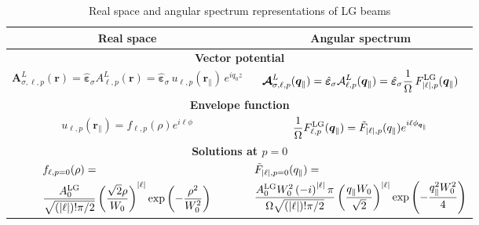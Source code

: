 \begin{table}[H]
\centering
\caption{Real space and angular spectrum representations of LG beams}
\label{tab:my_formulas}

\begin{tabular}{|c|c|}
\hline
\textbf{Real space} & \textbf{Angular spectrum} \\ \hline

\hline
\multicolumn{2}{|c|}{\textbf{Vector potential}} \\ \hline
\rule[-2.5ex]{0pt}{6.5ex} %
$\displaystyle \boldsymbol{A}^{L}_{\sigma, \ell, p}(\boldsymbol{r})
=
\hat{\boldsymbol{\varepsilon}}_\sigma A^{L}_{\ell, p}(\boldsymbol{r})
=
\hat{\boldsymbol{\varepsilon}}_\sigma
\, u_{\ell, p}(\boldsymbol{r}_\parallel)
\, e^{i q_0 z}$
&
$\displaystyle \boldsymbol{\mathcal{A}}^L_{\sigma, \ell, p}(\boldsymbol{q}_\parallel)
=
\hat{\boldsymbol{\varepsilon}}_\sigma \mathcal{A}^L_{\ell, p}(\boldsymbol{q}_\parallel)
=
\hat{\boldsymbol{\varepsilon}}_\sigma
\frac{1}{\Omega}
\, F_{|\ell|, p}^{\rm LG}(\boldsymbol{q}_\parallel)$ \\ \hline

\hline
\multicolumn{2}{|c|}{\textbf{Envelope function}} \\ \hline
\rule[-2.5ex]{0pt}{6.5ex}
$\displaystyle u_{\ell, p}(\boldsymbol{r}_\parallel)
=
f_{\ell, p}(\rho)e^{i \ell \phi}$
&
$\displaystyle \frac{1}{\Omega}F_{\ell, p}^{\rm LG}(\boldsymbol{q}_\parallel)
=
\tilde{F}_{\left|\ell\right|, p}(q_\parallel)e^{i \ell \phi_{\boldsymbol{q}_{\parallel}}}$ \\ \hline

\hline
\multicolumn{2}{|c|}{\textbf{Solutions at $p=0$}} \\ \hline
\rule[-6ex]{0pt}{13ex} %
$\begin{aligned} 
&\displaystyle f_{\ell, p=0}(\rho) = \\
&\displaystyle \frac{A^{\rm LG}_0}{\sqrt{(|\ell|)!\pi/2}}
\left( \frac{\sqrt{2}\rho}{W_0} \right)^{|\ell|} \exp\left( -\frac{\rho^2}{W_0^2} \right)
\end{aligned}$
&
$\begin{aligned} 
&\displaystyle \tilde{F}_{\left|\ell\right|, p=0}(q_\parallel) = \\
& \displaystyle \frac{A^{\rm LG}_0 W_0^2 \left(-i\right)^{\left|\ell\right|}\pi}{\Omega\sqrt{(|\ell|)!\pi/2}}
 \left( \frac{q_{\parallel} W_0}{\sqrt{2}} \right)^{|\ell|} \exp\left( -\frac{q_{\parallel}^2 W_0^2}{4} \right)
\end{aligned}$ \\ \hline 

\end{tabular}
\end{table}

